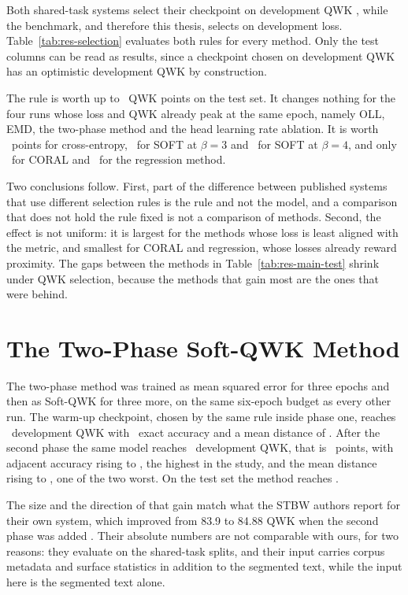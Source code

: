 Both shared-task systems select their checkpoint on development QWK
\cite{nazzal2025zai,trigui2025stbw}, while the benchmark, and therefore this thesis, selects on
development loss. Table~\ref{tab:res-selection} evaluates both rules for every method. Only the
test columns can be read as results, since a checkpoint chosen on development QWK has an
optimistic development QWK by construction.



The rule is worth up to \qwkselTestGainMax\ QWK points on the test set. It changes nothing for
the four runs whose loss and QWK already peak at the same epoch, namely OLL, EMD, the two-phase
method and the head learning rate ablation. It is worth \qwkselTestGainCE\ points for cross-entropy,
\qwkselTestGainSoftThree\ for SOFT at $\beta=3$ and \qwkselTestGainSoftFour\ for SOFT at
$\beta=4$, and only \qwkselTestGainCoral\ for CORAL and \qwkselTestGainMSE\ for the regression
method.

Two conclusions follow. First, part of the difference between published systems that use
different selection rules is the rule and not the model, and a comparison that does not hold the
rule fixed is not a comparison of methods. Second, the effect is not uniform: it is largest for
the methods whose loss is least aligned with the metric, and smallest for CORAL and regression,
whose losses already reward proximity. The gaps between the methods in
Table~\ref{tab:res-main-test} shrink under QWK selection, because the methods that gain most
are the ones that were behind.

\section{The Two-Phase Soft-QWK Method}
\label{sec:res-softqwk}

The two-phase method was trained as mean squared error for three epochs and then as Soft-QWK
for three more, on the same six-epoch budget as every other run. The warm-up checkpoint, chosen
by the same rule inside phase one, reaches \phaseOneQwk\ development QWK with \phaseOneAcc\
exact accuracy and a mean distance of \phaseOneDist. After the second phase the same model
reaches \devQwkSoftqwk\ development QWK, that is \softqwkPhaseTwoGain\ points, with adjacent
accuracy rising to \devPmSoftqwk, the highest in the study, and the mean distance rising to
\devDistSoftqwk, one of the two worst. On the test set the method reaches \testQwkSoftqwk.

The size and the direction of that gain match what the STBW authors report for their own system,
which improved from 83.9 to 84.88 QWK when the second phase was added
\cite{trigui2025stbw}. Their absolute numbers are not comparable with ours, for two reasons:
they evaluate on the shared-task splits, and their input carries corpus metadata and
surface statistics in addition to the segmented text, while the input here is the segmented
text alone.

